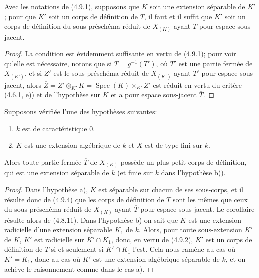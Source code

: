 \begin{proposition}[4.9.4]
\label{IV.2.4.9.4-fr}
Avec les notations de (4.9.1), supposons que $K$ soit une extension séparable
de $K'$; pour que $K'$ soit un corps de définition de $\overline T$, il faut
et il suffit que $K'$ soit un corps de définition du sous-préschéma réduit de
$X_{(K)}$ ayant $\overline T$ pour espace sous-jacent.
\end{proposition}

\begin{proof}
La condition est évidemment suffisante en vertu de (4.9.1); pour voir qu'elle
est nécessaire, notons que si $\overline T=g^{-1}(T')$, où $T'$ est une
partie fermée de $X_{(K')}$, et si $Z'$ est le sous-préschéma réduit de
$X_{(K')}$ ayant $T'$ pour espace sous-jacent, alors
$\overline Z=Z'\otimes_{K'}K=\operatorname{Spec}(K)\times_{K'}Z'$ est réduit
en vertu du critère (4.6.1, e)) et de l'hypothèse sur $K$ et a pour espace
sous-jacent $\overline T$.
\end{proof}

\begin{corollary}[4.9.5]
\label{IV.2.4.9.5-fr}
Supposons vérifiée l'une des hypothèses suivantes:
\begin{enumerate}
\item[a)] $k$ est de caractéristique $0$.
\item[b)] $K$ est une extension algébrique de $k$ et $X$ est de type fini sur
$k$.
\end{enumerate}
Alors toute partie fermée $\overline T$ de $X_{(K)}$ possède un plus petit
corps de définition, qui est une extension séparable de $k$ (et finie sur $k$
dans l'hypothèse b)).
\end{corollary}

\begin{proof}
Dans l'hypothèse a), $K$ est séparable sur chacun de ses sous-corps, et il
résulte donc de (4.9.4) que les corps de définition de $\overline T$ sont les
mêmes que ceux du sous-préschéma réduit de $X_{(K)}$ ayant $\overline T$ pour
espace sous-jacent. Le corollaire résulte alors de (4.8.11). Dans l'hypothèse
b) on sait que $K$ est une extension radicielle d'une extension séparable
$K_1$ de $k$. Alors, pour toute sous-extension $K'$ de $K$, $K'$ est
radicielle sur $K'\cap K_1$, donc, en vertu de (4.9.2), $K'$ est un corps de
définition de $\overline T$ si et seulement si $K'\cap K_1$ l'est. Cela nous
ramène au cas où $K'=K_1$, donc au cas où $K'$ est une extension algébrique
séparable de $k$, et on achève le raisonnement comme dans le cas a).
\end{proof}

